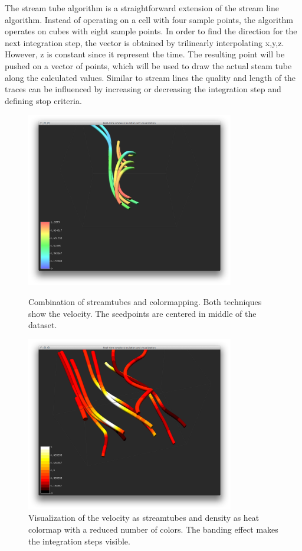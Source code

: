 The stream tube algorithm is a straightforward extension of the stream line algorithm. Instead of operating on a cell with four sample points, the algorithm operates on cubes with eight sample points. In order to find the direction for the next integration step, the vector is obtained by trilinearly  interpolating x,y,z. However, z is constant since it represent the time.
The resulting point will be pushed on a vector of points, which will be used to draw the actual steam tube along the calculated values. 
Similar to stream lines the quality and length of the traces can be influenced by increasing or decreasing the integration step and defining  stop criteria.


\begin{figure}[htbp]
\centering
\begin{minipage}[t]{0.48\textwidth}
        \includegraphics[height=3in]{figures/streamtubes/10tubes.png}
\caption{Combination of streamtubes and colormapping. Both techniques show the velocity. The seedpoints are centered in middle of the dataset.}
\label{fig:}
\end{minipage}\hspace{.04\textwidth}%
\begin{minipage}[t]{0.48\textwidth}
    \includegraphics[height=3in]{figures/streamtubes/21banding_velodensity.png}
    \caption{Visualization of the velocity as streamtubes and density as heat colormap with a reduced number of colors. The banding effect makes the integration steps visible.}
    \label{fig:}
\end{minipage}
\end{figure}

